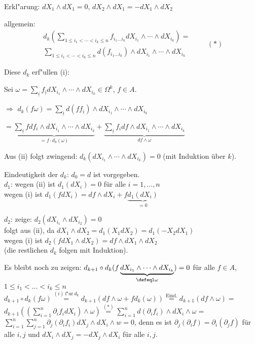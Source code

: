 \begin{SatzDef}
\begin{Bew}
Erkl"arung: $dX_1 \wedge dX_1 = 0$, $dX_2 \wedge dX_1 = - dX_1 \wedge dX_2$

allgemein:
\begin{equation*}
\begin{split}
 d_k(\displaystyle\sum_{1 \leq i_1 < \cdots < i_k \leq n} f_{i_1 \ldots i_k}
dX_{i_1} \wedge \cdots \wedge dX_{i_k}) =\\
\sum_{1 \leq i_1 < \cdots < i_k \leq n} d(f_{i_1 \ldots i_k}) \wedge dX_{i_1}
\wedge \cdots \wedge dX_{i_k} 
\end{split}
\qquad (\ast)
\end{equation*}

Diese $d_k$ erf"ullen (i):

Sei $\omega = \sum_{\underline{i}} f_{\underline{i}} dX_{i_1} \wedge \cdots \wedge dX_{i_k} \in \Omega^k$, $f \in A$.

$\Rightarrow$ $d_k(f \omega) = \sum_{\underline{i}} d(f f_{\underline{i}}) \wedge dX_{i_1} \wedge \cdots \wedge dX_{i_k}$

$= \underbrace{ \sum_{\underline{i}} f df_i \wedge dX_{i_1} \wedge \cdots \wedge dX_{i_k} }_{= f \cdot d_k(\omega)} + \underbrace{ \sum_{\underline{i}} f_i df \wedge dX_{i_1} \wedge \cdots \wedge dX_{i_k} }_{d f \wedge \omega}$

Aus (ii) folgt zwingend: $d_k(dX_{i_1}\wedge \cdots \wedge dX_{i_k}) = 0$ (mit 
Induktion \"uber $k$).

Eindeutigkeit der $d_k$: $d_0=d$ ist vorgegeben.\\
$d_1$: wegen (ii) ist $d_1(dX_i)=0$ f\"ur alle $i=1, \ldots, n$\\
wegen (i) ist $d_1(fdX_i)=df\wedge dX_i+f\underbrace{d_1(dX_i)}_{=0}$

$d_2$: zeige: $d_2(dX_{i_1}\wedge dX_{i_2})=0$\\
folgt aus (ii), da $dX_1\wedge dX_2=d_1(X_1 dX_2)=d_1(-X_2dX_1)$\\
wegen (i) ist $d_2(fdX_1\wedge dX_2)=df\wedge dX_1\wedge dX_2$\\
(die restlichen $d_k$ folgen mit Induktion).

Es bleibt noch zu zeigen: $d_{k+1}\circ d_k(f\underbrace{dX_{i_1}\wedge \cdots
\wedge
dX_{i_k}}_{\defeql \omega})=0$ f\"ur alle $f\in A$, $1\leq i_1<\dots<i_k\leq n$\\
$d_{k+1}\circ d_k(f\omega)
\stackrel{(i)\ \text{f"ur}\ d_k}{=}d_{k+1}(df\wedge \omega +fd_k(\omega))
\stackrel{\text{Eind.}}{=}d_{k+1}(df\wedge \omega) 
=$\\
$d_{k+1}\left(\left(\sum_{i=1}^{n}\partial_i f_i dX_i\right)\wedge
\omega\right)
\stackrel{(\ast)}{=}\sum_{i=1}^{n}d(\partial_if_i)\wedge dX_i\wedge \omega=$\\
$\sum_{i=1}^n \sum_{j=1}^n \partial_j (\partial_i f_i)dX_j\wedge dX_{i}\wedge w=0$,
denn es ist $\partial_j(\partial_i f) = \partial_i(\partial_j f)$ f\"ur alle $i,j$
und $dX_i\wedge dX_j=-dX_j\wedge dX_i$ f\"ur alle $i,j$.


\end{Bew}
\end{SatzDef}
